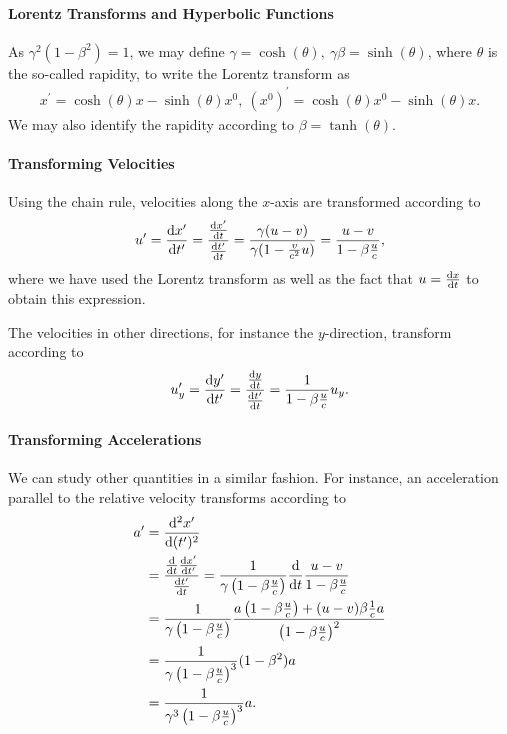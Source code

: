 \paragraph{Lorentz Transforms and Hyperbolic Functions}
As $\gamma^{2}(1 - \beta^{2}) = 1$, we may define $\gamma = \cosh(\theta),\ \gamma\beta = \sinh(\theta)$, where $\theta$ is the so-called rapidity, to write the Lorentz transform as
\begin{align*}
	x^{\prime} = \cosh(\theta)x - \sinh(\theta)x^{0},\ (x^{0})^{\prime} = \cosh(\theta)x^{0} - \sinh(\theta)x.
\end{align*}
We may also identify the rapidity according to $\beta = \tanh(\theta)$.

\paragraph{Transforming Velocities}
Using the chain rule, velocities along the $x$-axis are transformed according to
\begin{align*}
	u' = \dv{x'}{t'} = \frac{\dv{x'}{t}}{\dv{t'}{t}} = \frac{\gamma(u - v)}{\gamma(1 - \frac{v}{c^{2}}u)} = \frac{u - v}{1 - \beta\frac{u}{c}},
\end{align*}
where we have used the Lorentz transform as well as the fact that $u = \dv{x}{t}$ to obtain this expression.

The velocities in other directions, for instance the $y$-direction, transform according to
\begin{align*}
	u_{y}' = \dv{y'}{t'} = \frac{\dv{y}{t}}{\dv{t'}{t}} = \frac{1}{1 - \beta\frac{u}{c}}u_{y}.
\end{align*}

\paragraph{Transforming Accelerations}
We can study other quantities in a similar fashion. For instance, an acceleration parallel to the relative velocity transforms according to
\begin{align*}
	a^{\prime} &= \dv[2]{x^{\prime}}{(t^{\prime})} \\
	    &= \frac{\dv{t}\dv{x^{\prime}}{t^{\prime}}}{\dv{t^{\prime}}{t}} = \frac{1}{\gamma\left(1 - \beta\frac{u}{c}\right)}\dv{t}\frac{u - v}{1 - \beta\frac{u}{c}} \\
	    &= \frac{1}{\gamma\left(1 - \beta\frac{u}{c}\right)}\frac{a\left(1 - \beta\frac{u}{c}\right) + (u - v)\beta\frac{1}{c}a}{\left(1 - \beta\frac{u}{c}\right)^{2}} \\
	    &= \frac{1}{\gamma\left(1 - \beta\frac{u}{c}\right)^{3}}(1 - \beta^{2})a \\
	    &= \frac{1}{\gamma^{3}\left(1 - \beta\frac{u}{c}\right)^{3}}a.
\end{align*}

